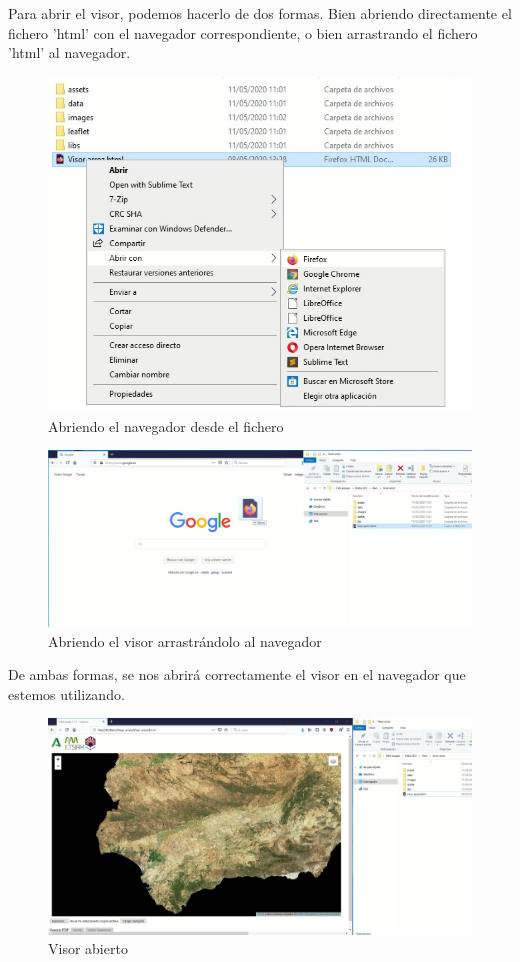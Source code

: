 \documentclass{article}
\begin{document}
Para abrir el visor, podemos hacerlo de dos formas. Bien abriendo directamente el fichero 'html' con el navegador correspondiente, o bien arrastrando el fichero 'html' al navegador. 

\begin{figure}[H]
	\centering
	\includegraphics[width=0.8\linewidth]{image1.jpg}
	\caption{Abriendo el navegador desde el fichero}
	\label{fig:image1}
\end{figure}

\begin{figure}[H]
	\centering
	\includegraphics[width=0.8\linewidth]{image2.jpg}
	\caption{Abriendo el visor arrastrándolo al navegador}
	\label{fig:image2}
\end{figure}

De ambas formas, se nos abrirá correctamente el visor en el navegador que estemos utilizando.

\begin{figure}[H]
	\centering
	\includegraphics[width=0.8\linewidth]{image3.jpg}
	\caption{Visor abierto}
	\label{fig:image3}
\end{figure}
\end{document}
